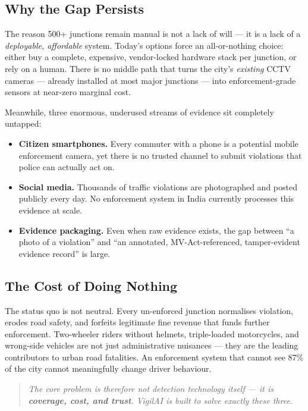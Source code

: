 \documentclass[11pt,a4paper]{article}
\begin{document}
\subsection{Why the Gap Persists}

The reason 500+ junctions remain manual is not a lack of will — it is a lack of a \emph{deployable, affordable} system. Today's options force an all-or-nothing choice: either buy a complete, expensive, vendor-locked hardware stack per junction, or rely on a human. There is no middle path that turns the city's \emph{existing} CCTV cameras — already installed at most major junctions — into enforcement-grade sensors at near-zero marginal cost.

Meanwhile, three enormous, underused streams of evidence sit completely untapped:

\begin{itemize}
  \item \textbf{Citizen smartphones.} Every commuter with a phone is a potential mobile enforcement camera, yet there is no trusted channel to submit violations that police can actually act on.
  \item \textbf{Social media.} Thousands of traffic violations are photographed and posted publicly every day. No enforcement system in India currently processes this evidence at scale.
  \item \textbf{Evidence packaging.} Even when raw evidence exists, the gap between ``a photo of a violation'' and ``an annotated, MV-Act-referenced, tamper-evident evidence record'' is large.
\end{itemize}

\subsection{The Cost of Doing Nothing}

The status quo is not neutral. Every un-enforced junction normalises violation, erodes road safety, and forfeits legitimate fine revenue that funds further enforcement. Two-wheeler riders without helmets, triple-loaded motorcycles, and wrong-side vehicles are not just administrative nuisances — they are the leading contributors to urban road fatalities. An enforcement system that cannot see 87\% of the city cannot meaningfully change driver behaviour.

\vspace{4pt}
\begin{quote}
\color{vigilaccent}\itshape The core problem is therefore not detection technology itself — it is \textbf{coverage, cost, and trust}. VigilAI is built to solve exactly these three.
\end{quote}
\end{document}
